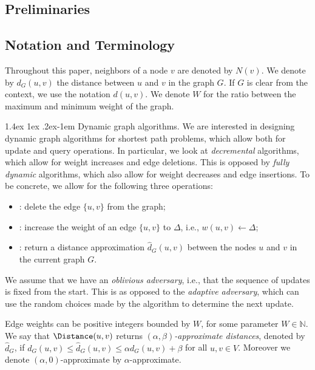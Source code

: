 \documentclass[11pt]{article}
\makeatletter
\theoremstyle{definition}
\theoremstyle{remark}
\renewcommand{\paragraph}{%
  \@startsection{paragraph}{4}%
  {\z@}{1.4ex \@plus 1ex \@minus .2ex}{-1em}%
  {\normalfont\normalsize\bfseries}%
}
\makeatother
\begin{document}
\begin{titlepage}
\section{Preliminaries}
\subsection{Notation and Terminology}\label{sc:notation}
Throughout this paper, neighbors of a node $v$ are denoted by $N(v)$. We denote by $d_G(u,v)$ the distance between $u$ and $v$ in the graph $G$. If $G$ is clear from the context, we use the notation $d(u,v)$. We denote $W$ for the ratio between the maximum and minimum weight of the graph.  

\paragraph{Dynamic graph algorithms.}
We are interested in designing dynamic graph algorithms for shortest path problems, which allow both for update and query operations. In particular, we look at \emph{decremental} algorithms, which allow for weight increases and edge deletions. This is opposed by \emph{fully dynamic} algorithms, which also allow for weight decreases and edge insertions. To be concrete, we allow for the following three operations:
\begin{itemize}
    \item {}: delete the edge $\{u,v\}$ from the graph;
    \item {}: increase the weight of an edge $\{u,v\}$ to $\Delta$, i.e., $w(u,v)\leftarrow \Delta $;
    \item {}: return a distance approximation $\hat d_G(u,v)$ between the nodes $u$ and $v$ in the current graph $G$.
\end{itemize}

We assume that we have an \emph{oblivious adversary}, i.e., that the sequence of updates is fixed from the start. This is as opposed to the \emph{adaptive adversary}, which can use the random choices made by the algorithm to determine the next update. 

Edge weights can be positive integers bounded by $W$, for some parameter $W\in \mathbb N$. We say that $\Distance(u,v)$ returns \emph{$(\alpha,\beta)$-approximate distances}, denoted by $\hat d_G$, if $d_G(u,v) \leq \hat d_G(u,v) \leq \alpha d_G(u,v)+\beta$ for all $u,v\in V$. Moreover we denote $(\alpha,0)$-approximate by $\alpha$-approximate. 


\end{titlepage}
\end{document}
